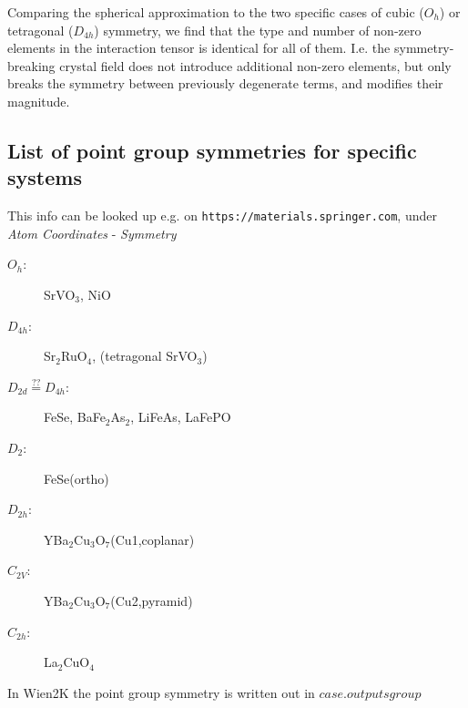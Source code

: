 \documentclass[12pt,a4paper]{scrartcl}
\numberwithin{equation}{section}
\begin{document}
Comparing the spherical approximation to the two specific cases of cubic ($O_h$) or tetragonal ($D_{4h}$) 
symmetry, we find that the type and number of non-zero elements in the interaction tensor is identical for all of them.
I.e. the symmetry-breaking crystal field does not introduce additional non-zero elements, but only
breaks the symmetry between previously degenerate terms, and modifies their magnitude.

\subsection{List of point group symmetries for specific systems}
This info can be looked up e.g. on \verb|https://materials.springer.com|, under \textit{Atom Coordinates} - \textit{Symmetry}
\begin{description}
 \item[$O_h$:] SrVO$_3$, NiO
 \item[$D_{4h}$:] Sr$_2$RuO$_4$, (tetragonal SrVO$_3$)
 \item[$D_{2d} \stackrel{??}{=} D_{4h}$:] FeSe, BaFe$_2$As$_2$, LiFeAs, LaFePO
 \item[$D_2$:] FeSe(ortho)
 \item[$D_{2h}$:] YBa$_2$Cu$_3$O$_7$(Cu1,coplanar) 
 \item[$C_{2V}$:] YBa$_2$Cu$_3$O$_7$(Cu2,pyramid) 
 \item[$C_{2h}$:] La$_2$CuO$_4$ 
\end{description}

In Wien2K the point group symmetry is written out in $case.outputsgroup$
\end{document}
